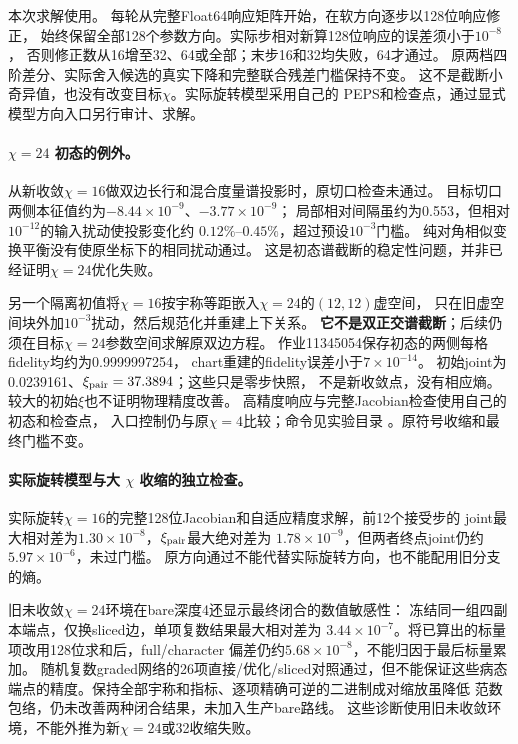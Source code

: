 本次求解使用。
每轮从完整Float64响应矩阵开始，在软方向逐步以128位响应修正，
始终保留全部128个参数方向。实际步相对新算128位响应的误差须小于$10^{-8}$，
否则修正数从16增至32、64或全部；末步16和32均失败，64才通过。
原两档四阶差分、实际舍入候选的真实下降和完整联合残差门槛保持不变。
这不是截断小奇异值，也没有改变目标$\chi$。实际旋转模型采用自己的
PEPS和检查点，通过显式模型方向入口另行审计、求解。

\paragraph{$\chi=24$ 初态的例外。}
从新收敛$\chi=16$做双边长行和混合度量谱投影时，原切口检查未通过。
目标切口两侧本征值约为$-8.44\times10^{-9}$、$-3.77\times10^{-9}$；
局部相对间隔虽约为0.553，但相对$10^{-12}$的输入扰动使投影变化约
$0.12\%$--$0.45\%$，超过预设$10^{-3}$门槛。
纯对角相似变换平衡没有使原坐标下的相同扰动通过。
这是初态谱截断的稳定性问题，并非已经证明$\chi=24$优化失败。

另一个隔离初值将$\chi=16$按宇称等距嵌入$\chi=24$的$(12,12)$虚空间，
只在旧虚空间块外加$10^{-3}$扰动，然后规范化并重建上下关系。
\textbf{它不是双正交谱截断}；后续仍须在目标$\chi=24$参数空间求解原双边方程。
作业11345054保存初态的两侧每格fidelity均约为0.9999997254，
chart重建的fidelity误差小于$7\times10^{-14}$。
初始joint为0.0239161、$\xi_{\rm pair}=37.3894$；这些只是零步快照，
不是新收敛点，没有相应熵。较大的初始$\xi$也不证明物理精度改善。
高精度响应与完整Jacobian检查使用自己的初态和检查点，
入口控制仍与原$\chi=4$比较；命令见实验目录
。原符号收缩和最终门槛不变。

\paragraph{实际旋转模型与大 $\chi$ 收缩的独立检查。}
实际旋转$\chi=16$的完整128位Jacobian和自适应精度求解，前12个接受步的
joint最大相对差为$1.30\times10^{-8}$，$\xi_{\rm pair}$最大绝对差为
$1.78\times10^{-9}$，但两者终点joint仍约$5.97\times10^{-6}$，未过门槛。
原方向通过不能代替实际旋转方向，也不能配用旧分支的熵。

旧未收敛$\chi=24$环境在bare深度4还显示最终闭合的数值敏感性：
冻结同一组四副本端点，仅换sliced边，单项复数结果最大相对差为
$3.44\times10^{-7}$。将已算出的标量项改用128位求和后，full/character
偏差仍约$5.68\times10^{-8}$，不能归因于最后标量累加。
随机复数graded网络的26项直接/优化/sliced对照通过，但不能保证这些病态
端点的精度。保持全部宇称和指标、逐项精确可逆的二进制成对缩放虽降低
范数包络，仍未改善两种闭合结果，未加入生产bare路线。
这些诊断使用旧未收敛环境，不能外推为新$\chi=24$或32收缩失败。

